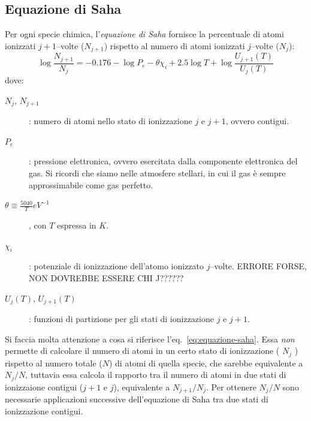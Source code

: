 \subsection{Equazione di Saha}\label{sec:equazione-saha}
Per ogni specie chimica, l'\emph{equazione di Saha} fornisce la percentuale di atomi ionizzati $j+1$--volte ($N_{j+1}$) rispetto al numero di atomi ionizzati $j$--volte ($N_j$):
\begin{equation}\label{eq:equazione-saha}
    \log \dfrac{N_{j+1}}{N_j} = -0.176 - \log P_e - \theta \chi_i + 2.5 \log T + \log \dfrac{{U_{j+1}}(T)}{{U_j}(T)}
\end{equation}
dove:
\begin{description}
    \item[$N_j$, $N_{j+1}$]: numero di atomi nello stato di ionizzazione $j$ e $j+1$, ovvero contigui.
    \item[$P_e$]: pressione elettronica, ovvero esercitata dalla componente elettronica del gas. Si ricordi che siamo nelle atmosfere stellari, in cui il gas è sempre approssimabile come gas perfetto.
    \item[$\theta \equiv \frac{5040}{T} \si{eV^{-1}}$], con $T$ espressa in $\si{K}$.
    \item[$\chi_i$]: potenziale di ionizzazione dell'atomo ionizzato $j$--volte. ERRORE FORSE, NON DOVREBBE ESSERE CHI J??????
    \item[${U_j}(T)$, ${U_{j+1}}(T)$]: funzioni di partizione per gli stati di ionizzazione $j$ e $j+1$.
\end{description}
Si faccia molta attenzione a cosa si riferisce l'eq.~\eqref{eq:equazione-saha}. Essa \emph{non} permette di calcolare il numero di atomi in un certo stato di ionizzazione ( $N_j$ ) rispetto al numero totale ($N$) di atomi di quella specie, che sarebbe equivalente a $N_j / N$, tuttavia essa calcola il rapporto tra il numero di atomi in due stati di ionizzaione contigui ($j+1$ e $j$), equivalente a $N_{j+1} / N_j$. Per ottenere $N_j / N$ sono necessarie applicazioni successive dell'equazione di Saha tra due stati di ionizzazione contigui.

